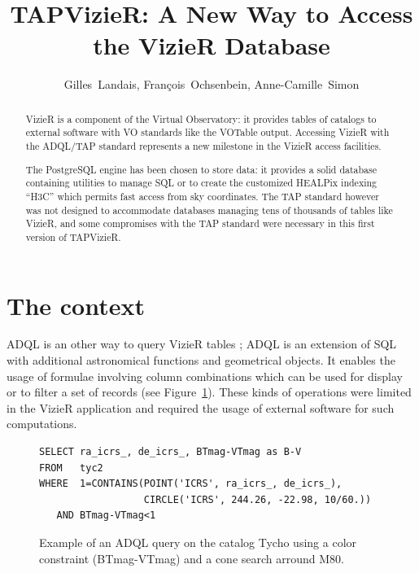 
\resetcounters



\resetcounters

\title{TAPVizieR: A New Way to Access the VizieR Database}
\author{Gilles~Landais, Fran\c cois~Ochsenbein, Anne-Camille~Simon
}


\begin{abstract}
VizieR is a component of the Virtual Observatory: it provides tables of
catalogs to external software with VO standards like the VOTable output.
Accessing VizieR with the ADQL/TAP standard represents a new milestone
in the VizieR access facilities.

The PostgreSQL engine has been chosen to store data: it provides a solid
database containing utilities to manage SQL or to create the customized
HEALPix indexing ``H3C'' which permits fast access from sky coordinates.
The TAP standard however was not designed to accommodate databases
managing tens of thousands of tables like VizieR, and some compromises
with the TAP standard were necessary in this first version of TAPVizieR.
\end{abstract}

\section{The context}

ADQL \citep{adql_2011} is an other way to query VizieR tables 
\citep{ochsenbein_2000}; ADQL is an extension of SQL 
with additional astronomical functions and geometrical objects. 
It enables the usage of formulae involving column combinations which can be used 
for display or to filter a set of records (see Figure~\ref{P044:ADQLexample}). 
These kinds of operations were limited in the VizieR application and required 
the usage of external software for such computations.

\begin{figure}[!h] \center
\begin{footnotesize}
\begin{verbatim}
SELECT ra_icrs_, de_icrs_, BTmag-VTmag as B-V
FROM   tyc2
WHERE  1=CONTAINS(POINT('ICRS', ra_icrs_, de_icrs_),
                  CIRCLE('ICRS', 244.26, -22.98, 10/60.))
   AND BTmag-VTmag<1
\end{verbatim}\end{footnotesize}
\caption{Example of an ADQL query on the catalog Tycho using a color 
constraint (BTmag-VTmag) and a cone search arround M80.}\label{P044:ADQLexample}
\end{figure}


